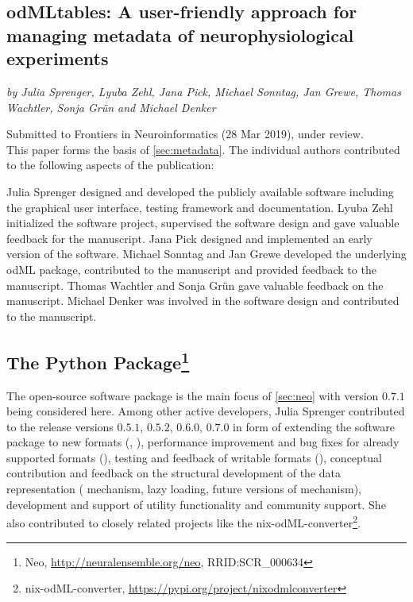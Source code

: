 \subsection*{odMLtables: A user-friendly approach for managing metadata of neurophysiological experiments}
\textit{by Julia Sprenger, Lyuba Zehl, Jana Pick, Michael Sonntag, Jan Grewe, Thomas Wachtler, Sonja Grün and Michael Denker}

Submitted to Frontiers in Neuroinformatics (28 Mar 2019), under review.\\

This paper forms the basis of \cref{sec:metadata}. The individual authors contributed to the following aspects of the publication:

Julia Sprenger designed and developed the publicly available software including the graphical user interface, testing framework and documentation. Lyuba Zehl initialized the software project, supervised the software design and gave valuable feedback for the manuscript. Jana Pick designed and implemented an early version of the software. Michael Sonntag and Jan Grewe developed the underlying odML package, contributed to the manuscript and provided feedback to the manuscript. Thomas Wachtler and Sonja Grün gave valuable feedback on the manuscript. Michael Denker was involved in the software design and contributed to the manuscript.

\subsection*{The  Python Package\footnote{Neo, \url{http://neuralensemble.org/neo}, RRID:SCR\_000634}}
The open-source software package  \citep{Garcia_2014} is the main focus of \cref{sec:neo}  with version $0.7.1$ being considered here. Among other active  developers, Julia Sprenger contributed to the release versions $0.5.1$, $0.5.2$, $0.6.0$, $0.7.0$ in form of extending the software package to new formats (, ), performance improvement and bug fixes for already supported formats (), testing and feedback of writable formats (), conceptual contribution and feedback on the structural development of the data representation ( mechanism, lazy loading, future versions of  mechanism), development and support of utility functionality and community support. She also contributed to closely related projects like the nix-odML-converter\footnote{nix-odML-converter, \url{https://pypi.org/project/nixodmlconverter}}.

